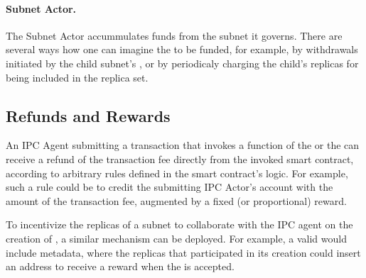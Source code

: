 \paragraph{Subnet Actor.}
The Subnet Actor accummulates funds from the subnet it governs.
There are several ways how one can imagine the \sa to be funded,
for example, by withdrawals initiated by the child subnet's \gw,
or by periodicaly charging the child's replicas for being included in the replica set.

\subsection{Refunds and Rewards}

An IPC Agent submitting a transaction that invokes a function of the \gw or the \sa can receive a refund of the transaction fee directly from the invoked smart contract,
according to arbitrary rules defined in the smart contract's logic.
For example, such a rule could be to credit the submitting IPC Actor's account with the amount of the transaction fee, augmented by a fixed (or proportional) reward.

To incentivize the replicas of a subnet to collaborate with the IPC agent on the creation of \pofsFull, a similar mechanism can be deployed.
For example, a valid \pof would include metadata, where the replicas that participated in its creation could insert an address to receive a reward when the \pof is accepted.